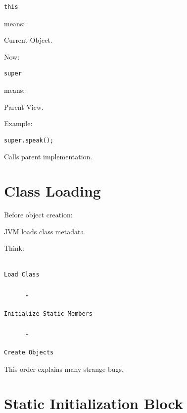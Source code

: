 \documentclass[11pt,a4paper]{book}
\begin{document}
\begin{verbatim}
this
\end{verbatim}

means:

Current Object.


Now:

\begin{verbatim}
super
\end{verbatim}

means:

Parent View.


Example:

\begin{verbatim}
super.speak();
\end{verbatim}


Calls parent implementation.


\section{Class Loading}

Before object creation:

JVM loads class metadata.


Think:

\begin{verbatim}

Load Class

      ↓

Initialize Static Members

      ↓

Create Objects

\end{verbatim}


This order explains many strange bugs.


\section{Static Initialization Block}
\end{document}
